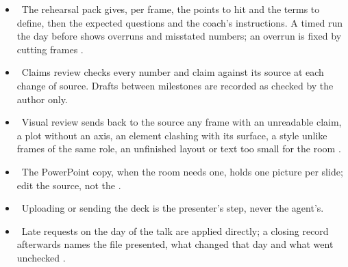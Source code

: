 \begin{itemize}
  \item \review\ The rehearsal pack gives, per frame, the points to hit and the terms to
        define, then the expected questions and the coach's instructions. A timed run the
        day before shows overruns and misstated numbers; an overrun is fixed by cutting
        frames \cite[The rehearsal pack]{skill:deck-production}.
  \item \review\ Claims review checks every number and claim against its source at each
        change of source. Drafts between milestones are recorded as checked by the author
        only.
  \item \review\ Visual review sends back to the source any frame with an unreadable claim, a
        plot without an axis, an
        element clashing with its surface, a style unlike frames of the same role, an unfinished
        layout or text too small for the room \cite[Build and review]{skill:deck-production}.
  \item \evidence\ The PowerPoint copy, when the room needs one, holds one picture per
        slide; edit the source, not the .
  \item \gap\ Uploading or sending the deck is the presenter's step, never the agent's.
  \item \evidence\ Late requests on the day of the talk are applied directly; a closing
        record afterwards names the file presented, what changed that day and what went
        unchecked \cite[The day of the talk]{skill:deck-production}.
\end{itemize}

